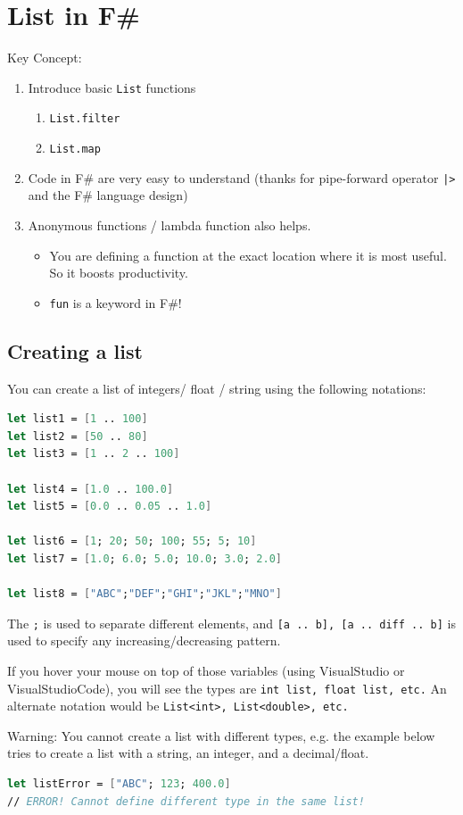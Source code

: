 \documentclass[12pt]{article}
\begin{document}
\pagebreak

\section{List in F\#}
Key Concept:
\begin{enumerate}
\item Introduce basic \texttt{List} functions
\begin{enumerate}
\item \texttt{List.filter} 
\item \texttt{List.map}
\end{enumerate}
\item Code in F\# are very easy to understand (thanks for pipe-forward operator \texttt{|>} and the F\# language design)
\item Anonymous functions / lambda function also helps.
\begin{itemize}
\item You are defining a function at the exact location where it is most useful. So it boosts productivity.
\item \texttt{fun} is a keyword in F\#! 
\end{itemize}
\end{enumerate}

\subsection{Creating a list}
You can create a list of integers/ float / string using the following notations:
\begin{lstlisting}[language=FSharp]
let list1 = [1 .. 100]          
let list2 = [50 .. 80]
let list3 = [1 .. 2 .. 100]      

let list4 = [1.0 .. 100.0]      
let list5 = [0.0 .. 0.05 .. 1.0]

let list6 = [1; 20; 50; 100; 55; 5; 10]
let list7 = [1.0; 6.0; 5.0; 10.0; 3.0; 2.0]

let list8 = ["ABC";"DEF";"GHI";"JKL";"MNO"]
\end{lstlisting}
The \texttt{;} is used to separate different elements, and \texttt{[a .. b], [a .. diff .. b]} is used to specify any increasing/decreasing pattern.

If you hover your mouse on top of those variables (using VisualStudio or VisualStudioCode), you will see the types are \texttt{int list, float list, etc.} An alternate notation would be \texttt{List<int>, List<double>, etc.}

Warning: You cannot create a list with different types, e.g. the example below tries to create a list with a string, an integer, and a decimal/float.
\begin{lstlisting}[language=FSharp]
let listError = ["ABC"; 123; 400.0]
// ERROR! Cannot define different type in the same list!
\end{lstlisting}
\end{document}
